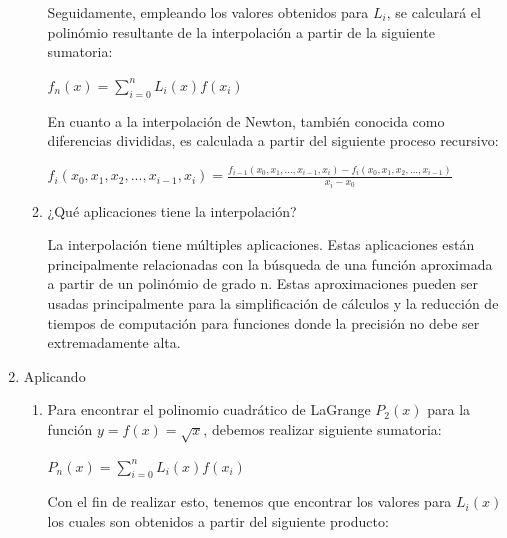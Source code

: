\documentclass[english,notitlepage,letterpaper, 10pt]{article} %
\begin{document}
\begin{enumerate}
\begin{enumerate}
      Seguidamente, empleando los valores obtenidos para $L_i$, se calculará el polinómio resultante de la interpolación a partir de la siguiente sumatoria:

      \begin{center}
        \begin{math}
          f_n(x)  = \displaystyle\sum_{i=0}^n L_i(x)f(x_i)
        \end{math}
      \end{center}
      
      En cuanto a la interpolación de Newton, también conocida como diferencias divididas, es calculada a partir del siguiente proceso recursivo:

      \begin{center}
        \begin{math}
          \displaystyle f_i(x_0,x_1,x_2,...,x_{i-1},x_i) = \frac{ f_{i-1}(x_0,x_1,...,x_{i-1},x_i)-f_i(x_0,x_1,x_2,...,x_{i-1})}{x_i - x_0}
        \end{math}
      \end{center}

      \item ¿Qué aplicaciones tiene la interpolación?

      La interpolación tiene múltiples aplicaciones. Estas aplicaciones están principalmente relacionadas con la búsqueda de una función aproximada a partir de un polinómio de grado n. Estas aproximaciones pueden ser usadas principalmente para la simplificación de cálculos y la reducción de tiempos de computación para funciones donde la precisión no debe ser extremadamente alta.

    \end{enumerate}

    \item Aplicando
    
    \begin{enumerate}

      \item Para encontrar el polinomio cuadrático de LaGrange $P_2(x)$ para la función $y=f(x)=\sqrt{x}$, debemos  realizar siguiente sumatoria:

      \begin{center}
        \begin{math}
          P_n(x)  = \displaystyle\sum_{i=0}^n L_i(x)f(x_i)
        \end{math}
      \end{center}

      Con el fin de realizar esto, tenemos que encontrar los valores para $L_i(x)$ los cuales son obtenidos a partir del siguiente producto:


\end{enumerate}
\end{enumerate}
\end{document}
